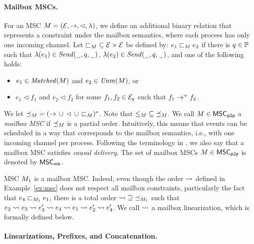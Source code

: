 \documentclass{article}
\begin{document}
\paragraph*{Mailbox MSCs.}

For an MSC $M = (\mathcal{E},\to,\lhd,\lambda)$, we define
an additional binary relation that represents a constraint
under the mailbox semantics, where each process has only one incoming channel.
Let ${\sqsubset}_M \subseteq \mathcal{E} \times \mathcal{E}$
be defined by: $e_1 \sqsubset_M e_2$ if there is $q \in \mathbb{P}$
such that $\lambda(e_1) \in {\mathit{Send}(\hspace{0.1em}\underline{\hspace{0.5em}}\hspace{0.1em},q,\hspace{0.1em}\underline{\hspace{0.5em}}\hspace{0.1em})}$,
$\lambda(e_2) \in {\mathit{Send}(\hspace{0.1em}\underline{\hspace{0.5em}}\hspace{0.1em},q,\hspace{0.1em}\underline{\hspace{0.5em}}\hspace{0.1em})}$, and one of the following holds:
\begin{itemize}\itemsep=0.5ex
\item $e_1 \in \mathit{Matched}(M)$ and $e_2 \in \mathit{Unm}(M)$, or
\item $e_1 \lhd f_1$ and $e_2 \lhd f_2$ for some $f_1,f_2 \in \mathcal{E}_q$ such that $f_1 \to^+ f_2$.
\end{itemize}

We let ${\preceq_M} = ({\to} \,\cup\, {\lhd} \,\cup\, {\sqsubset_M})^\ast$.
Note that ${\le_M} \subseteq {\preceq_M}$.
%
We call $M \in \mathsf{MSC}_{\mathsf{p2p}}$ a \emph{mailbox MSC}
if ${\preceq_M}$ is a partial order.
Intuitively, this means that events can be scheduled in a way that corresponds
to the mailbox semantics, i.e., with one incoming channel per process.
Following the terminology in \cite{DBLP:conf/cav/BouajjaniEJQ18}, we also say that
a mailbox MSC satisfies \emph{causal delivery}.
The set of mailbox MSCs $M \in \mathsf{MSC}_{\mathsf{p2p}}$ is denoted by $\mathsf{MSC}_{\mathsf{mb}}$.

\begin{example}\label{ex:mailbox-msc}
    MSC $M_{1}$ is a mailbox MSC. Indeed, even though the order $\rightsquigarrow$ defined in Example~\ref{ex:msc} does not respect all mailbox constraints, particularly the fact that $e_4 \sqsubset_{M_{1}} e_1$, there is a total order $ {\rightsquigarrow} \supseteq {\preceq_{M_{1}}}$ such that $
    e_2 \rightsquigarrow e_3 \rightsquigarrow e_3' \rightsquigarrow e_4 \rightsquigarrow e_1 \rightsquigarrow e_2' \rightsquigarrow e_4'$. We call $\rightsquigarrow$ a mailbox linearization, which is formally defined below.
\end{example}

\paragraph*{Linearizations, Prefixes, and Concatenation.}
\end{document}
